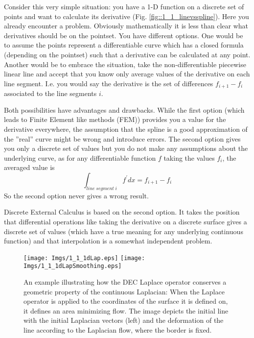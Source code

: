 Consider this very simple situation: you have a 1-D function on a discrete set of points and want to calculate its derivative (Fig. \ref{fig::1_1_linevsspline}). Here you already encounter a problem. Obviously mathematically it is less than clear what derivatives should be on the pointset. You have different options. One would be to assume the points represent a differentiable curve which has a closed formula (depending on the pointset) such that a derivative can be calculated at any point. Another would be to embrace the situation, take the non-differentiable piecewise linear line and accept that you know only average values of the derivative on each line segment. I.e. you would say the derivative is the set of differences $f_{i+1} - f_i$ associated to the line segments $i$.

Both possibilities have advantages and drawbacks. While the first option (which leads to Finite Element like methods (FEM)) provides you a value for the derivative everywhere, the assumption that the spline is a good approximation of the ''real'' curve might be wrong and introduce errors. The second option gives you only a discrete set of values but you do not make any assumptions about the underlying curve, as for any differentiable function $f$ taking the values $f_i$, the averaged value is
\[\int_{line\;segment\;i} f^\prime dx = f_{i+1} - f_i\] 
So the second option never gives a wrong result. 

Discrete External Calculus is based on the second option. It takes the position that differential operations like taking the derivative on a discrete surface gives a discrete set of values (which have a true meaning for any underlying continuous function) and that interpolation is a somewhat independent problem.

\begin{figure}
\begin{center}
\texttt{[image: Imgs/1\_1\_1dLap.eps]}
\texttt{[image: Imgs/1\_1\_1dLapSmoothing.eps]}
\end{center}
\caption{An example illustrating how the DEC Laplace operator conserves a geometric property of the continuous Laplacian: When the Laplace operator is applied to the coordinates of the surface it is defined on, it defines an area minimizing flow. The image depicts the initial line with the initial Laplacian vectors (left) and the deformation of the line according to the Laplacian flow, where the border is fixed.}
\label{fig::1_1_1dSmoothing} 
\end{figure}

